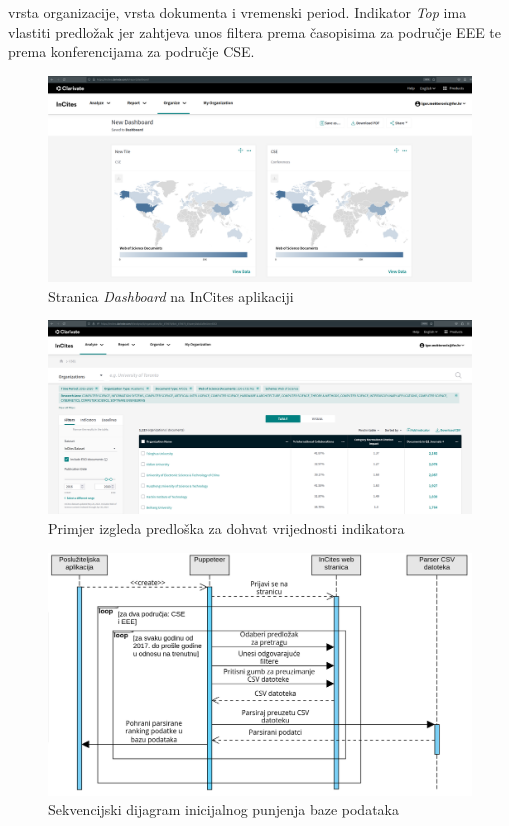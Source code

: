 \documentclass[times, utf8, zavrsni]{fer}
\begin{document}
vrsta organizacije, vrsta dokumenta i vremenski period. Indikator \emph{Top} ima vlastiti predložak jer zahtjeva unos filtera prema časopisima za područje EEE te 
prema konferencijama za područje CSE. 
\begin{figure}[htb]
    \hspace*{-2cm} 
       \includegraphics[scale=0.21]{dashboard.png} 
       \caption{Stranica \emph{Dashboard} na InCites aplikaciji}
       \label{fig:dashboard}
       \end{figure} 
\begin{figure}[htb]
        \hspace*{-2cm} 
           \includegraphics[scale=0.21]{predlozak.png} 
           \caption{Primjer izgleda predloška za dohvat vrijednosti indikatora}
           \label{fig:predlozak}
           \end{figure}  
           \FloatBarrier      
\begin{figure}[htb]
    \centering
       \includegraphics[scale=0.3]{sekvencijski.png} 
       \caption{Sekvencijski dijagram inicijalnog punjenja baze podataka}
       \label{fig:sekvencijski}
       \end{figure}
\end{document}
